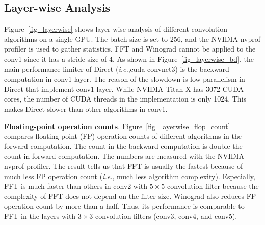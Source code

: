 \subsection{Layer-wise Analysis}

Figure~\ref{fig_layerwise} shows layer-wise analysis of different convolution algorithms on a single GPU. The batch size is set to 256, and the NVIDIA nvprof profiler is used to gather statistics. \textsf{FFT} and \textsf{Winograd} cannot be applied to the \textsf{conv1} since it has a stride size of 4. As shown in Figure~\ref{fig_layerwise_bd}, the main performance limiter of \textsf{Direct} (\textit{i.e.},cuda-convnet3) is the backward computation in \textsf{conv1} layer. The reason of the slowdown is low parallelism in \textsf{Direct} that implement \textsf{conv1} layer. While NVIDIA Titan X has 3072 CUDA cores, the number of CUDA threads in the implementation is only 1024. This makes \textsf{Direct} slower than other algorithms in \textsf{conv1}. 


{\bf Floating-point operation counts}. Figure~\ref{fig_layerwise_flop_count} compares floating-point (FP) operation counts of different algorithms in the forward computation. The count in the backward computation is double the count in forward computation. The numbers are measured with the NVIDIA nvprof profiler. The result tells us that \textsf{FFT} is usually the fastest because of much less FP operation count (\textit{i.e.}, much less algorithm complexity). Especially, \textsf{FFT} is much faster than others in \textsf{conv2} with $5 \times 5$ convolution filter because the complexity of \textsf{FFT} does not depend on the filter size. \textsf{Winograd} also reduces FP operation count by more than a half. Thus, its performance is comparable to \textsf{FFT} in the layers with $3 \times 3$ convolution filters (\textsf{conv3}, \textsf{conv4}, and \textsf{conv5}).


